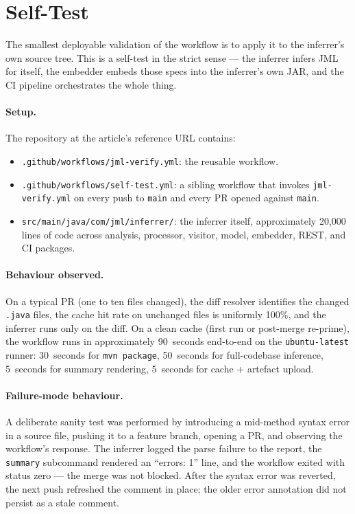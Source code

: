 \section{Self-Test}
\label{sec:selftest}

The smallest deployable validation of the workflow is to apply it to the inferrer's own source tree. This is a self-test in the strict sense --- the inferrer infers JML for itself, the embedder embeds those specs into the inferrer's own JAR, and the CI pipeline orchestrates the whole thing.

\paragraph{Setup.}
The repository at the article's reference URL contains:

\begin{itemize}
    \item {\tt .github/workflows/jml-verify.yml}: the reusable workflow.
    \item {\tt .github/workflows/self-test.yml}: a sibling workflow that invokes {\tt jml-verify.yml} on every push to {\tt main} and every PR opened against {\tt main}.
    \item {\tt src/main/java/com/jml/inferrer/}: the inferrer itself, approximately 20{,}000 lines of code across analysis, processor, visitor, model, embedder, REST, and CI packages.
\end{itemize}

\paragraph{Behaviour observed.}
On a typical PR (one to ten files changed), the diff resolver identifies the changed {\tt .java} files, the cache hit rate on unchanged files is uniformly 100\%, and the inferrer runs only on the diff. On a clean cache (first run or post-merge re-prime), the workflow runs in approximately 90~seconds end-to-end on the {\tt ubuntu-latest} runner: 30~seconds for {\tt mvn package}, 50~seconds for full-codebase inference, 5~seconds for summary rendering, 5~seconds for cache + artefact upload.

\paragraph{Failure-mode behaviour.}
A deliberate sanity test was performed by introducing a mid-method syntax error in a source file, pushing it to a feature branch, opening a PR, and observing the workflow's response. The inferrer logged the parse failure to the report, the {\tt summary} subcommand rendered an ``errors: 1'' line, and the workflow exited with status zero --- the merge was not blocked. After the syntax error was reverted, the next push refreshed the comment in place; the older error annotation did not persist as a stale comment.

